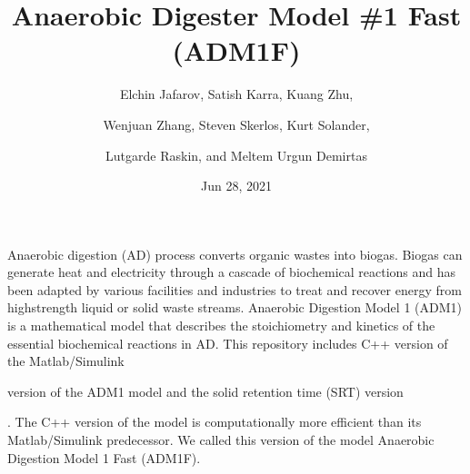 \documentclass[a4paper,10pt,english]{sphinxmanual}
\title{Anaerobic Digester Model \#1 Fast (ADM1F)}
\date{Jun 28, 2021}
\author{Elchin Jafarov, Satish Karra, Kuang Zhu,\and Wenjuan Zhang, Steven Skerlos, Kurt Solander,\and Lutgarde Raskin, and Meltem Urgun Demirtas}
\let\sphinxpxdimen\pdfpxdimen\else\newdimen\sphinxpxdimen
\begin{document}
\pagestyle{empty}
\sphinxmaketitle
\pagestyle{plain}
\sphinxtableofcontents
\pagestyle{normal}
\label{\detokenize{index::doc}}


\sphinxAtStartPar
Anaerobic digestion (AD) process converts organic wastes into biogas. Biogas can generate heat and electricity through a cascade of biochemical reactions and has been adapted by various facilities and industries to treat and recover energy from high\sphinxhyphen{}strength liquid or solid waste streams. Anaerobic Digestion Model 1 (ADM1) is a mathematical model that describes the stoichiometry and kinetics of the essential biochemical reactions in AD. This repository includes C++ version of the Matlab/Simulink %
\begin{footnote}[1]\sphinxAtStartFootnote
{}
%
\end{footnote} version of the ADM1 model and the solid retention time (SRT) version %
\begin{footnote}[2]\sphinxAtStartFootnote
{}
%
\end{footnote}. The C++ version of the model is computationally more efficient than its Matlab/Simulink predecessor. We called this version of the model Anaerobic Digestion Model 1 Fast (ADM1F).

\noindent\sphinxincludegraphics[width=1216\sphinxpxdimen,height=685\sphinxpxdimen]{{digester_m}.png}
\end{document}
